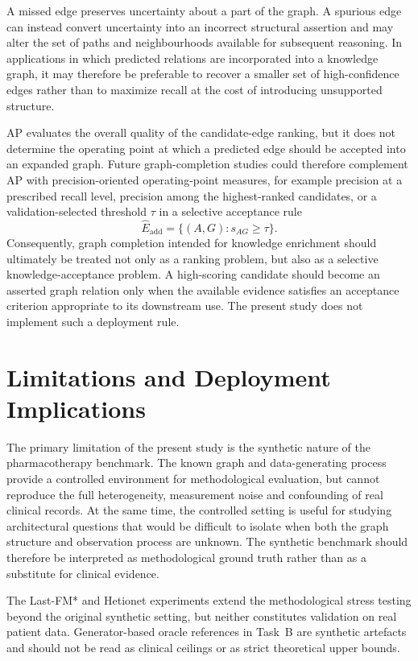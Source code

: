 A missed edge preserves uncertainty about a part of the graph.
A spurious edge can instead convert uncertainty into an incorrect structural assertion and
may alter the set of paths and neighbourhoods available for subsequent reasoning.
In applications in which predicted relations are incorporated into a knowledge graph, it may
therefore be preferable to recover a smaller set of high-confidence edges rather than to
maximize recall at the cost of introducing unsupported structure.

AP evaluates the overall quality of the candidate-edge ranking, but it does not determine the
operating point at which a predicted edge should be accepted into an expanded graph.
Future graph-completion studies could therefore complement AP with precision-oriented
operating-point measures, for example precision at a prescribed recall level, precision among
the highest-ranked candidates, or a validation-selected threshold $\tau$ in a selective
acceptance rule
\begin{equation}
\label{eq:joint-eadd}
\hat{E}_{\mathrm{add}}
=
\bigl\{(A,G):s_{AG}\ge\tau\bigr\}.
\end{equation}
Consequently, graph completion intended for knowledge enrichment should ultimately be
treated not only as a ranking problem, but also as a selective knowledge-acceptance
problem. A high-scoring candidate should become an asserted graph relation only when the
available evidence satisfies an acceptance criterion appropriate to its downstream use.
The present study does not implement such a deployment rule.

\section{Limitations and Deployment Implications}
\label{sec:joint-limitations}

The primary limitation of the present study is the synthetic nature of the pharmacotherapy
benchmark. The known graph and data-generating process provide a controlled environment
for methodological evaluation, but cannot reproduce the full heterogeneity, measurement
noise and confounding of real clinical records.
At the same time, the controlled setting is useful for studying architectural questions that
would be difficult to isolate when both the graph structure and observation process are
unknown. The synthetic benchmark should therefore be interpreted as methodological
ground truth rather than as a substitute for clinical evidence.

The Last-FM* and Hetionet experiments extend the methodological stress testing beyond
the original synthetic setting, but neither constitutes validation on real patient data.
Generator-based oracle references in Task~B are synthetic artefacts and should not be read
as clinical ceilings or as strict theoretical upper bounds.

